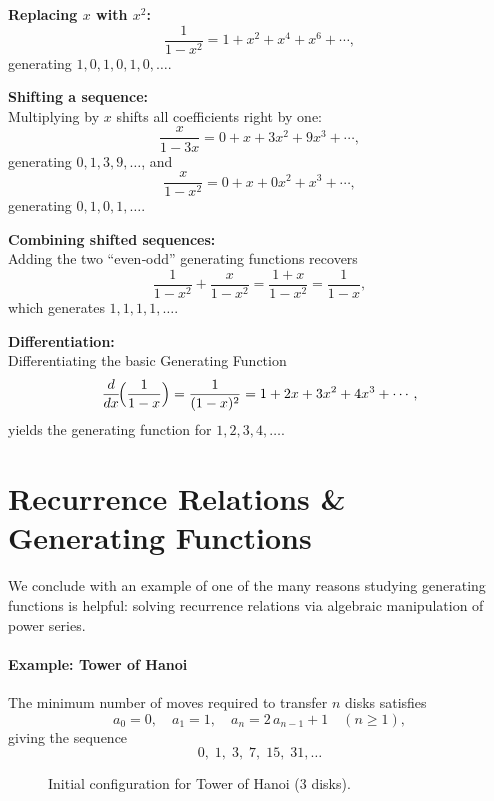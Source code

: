 \documentclass{article}
\begin{document}
\medskip
\noindent
\textbf{Replacing \(x\) with \(x^2\):}
\[
\frac{1}{1-x^2} = 1 + x^2 + x^4 + x^6 + \cdots,
\]
generating \(1,0,1,0,1,0,\dots\).

\medskip
\noindent
\textbf{Shifting a sequence:}\\
Multiplying by \(x\) shifts all coefficients right by one:
\[
\frac{x}{1-3x} = 0 + x + 3x^2 + 9x^3 + \cdots,
\]
generating \(0,1,3,9,\dots\), and
\[
\frac{x}{1-x^2} = 0 + x + 0x^2 + x^3 + \cdots,
\]
generating \(0,1,0,1,\dots\).

\medskip
\noindent
\textbf{Combining shifted sequences:}\\
Adding the two “even‑odd” generating functions recovers
\[
\frac{1}{1-x^2} + \frac{x}{1-x^2} = \frac{1+x}{1-x^2} = \frac{1}{1-x},
\]
which generates \(1,1,1,1,\dots\).

\medskip
\noindent
\textbf{Differentiation:}\\
Differentiating the basic Generating Function
\[
\frac{d}{dx}\!\Bigl(\frac{1}{1-x}\Bigr)
= \frac{1}{(1-x)^2}
= 1 + 2x + 3x^2 + 4x^3 + \cdots,
\]
yields the generating function for \(1,2,3,4,\dots\).


\medskip

\FloatBarrier            %

\section{Recurrence Relations \& Generating Functions}

We conclude with an example of one of the many reasons studying generating functions is helpful: solving recurrence relations via algebraic manipulation of power series.

\paragraph{Example: Tower of Hanoi}  
The minimum number of moves required to transfer \(n\) disks satisfies
\[
a_0 = 0,\quad
a_1 = 1,\quad
a_n = 2\,a_{n-1} + 1 \quad(n\ge1),
\]
giving the sequence
\[
0,\;1,\;3,\;7,\;15,\;31,\dots
\]

\begin{figure}[ht]
  \centering
  \caption{Initial configuration for Tower of Hanoi (3 disks).}
\end{figure}
\end{document}
